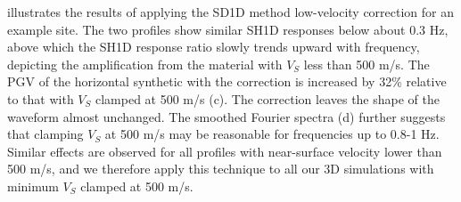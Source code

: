  illustrates the results of applying the SD1D method low-velocity correction for an example site. The two profiles show similar SH1D responses below about 0.3 Hz, above which the SH1D response ratio slowly trends upward with frequency, depicting the amplification from the material with $V_S$ less than 500 m/s. The PGV of the horizontal synthetic with the correction is increased by 32\% relative to that with $V_S$ clamped at 500 m/s (c). The correction leaves the shape of the waveform almost unchanged. The smoothed Fourier spectra (d) further suggests that clamping $V_S$ at 500 m/s may be reasonable for frequencies up to 0.8-1 Hz. Similar effects are observed for all profiles with near-surface velocity lower than 500 m/s, and we therefore apply this technique to all our 3D simulations with minimum $V_S$ clamped at 500 m/s.




